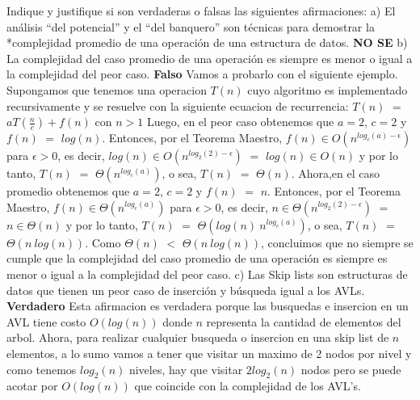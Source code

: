 \documentclass[10pt,a4paper]{article}
\begin{document}
Indique y justifique si son verdaderas o falsas las siguientes afirmaciones:
\newline
\newline
a) El análisis “del potencial” y el “del banquero” son técnicas para demostrar la *complejidad promedio de una operación de una estructura de datos. \textbf{NO SE}
\newline
\newline
b) La complejidad del caso promedio de una operación es siempre es menor o igual a la complejidad del peor caso. \textbf{Falso}
\newline
\newline
Vamos a probarlo con el siguiente ejemplo. Supongamos que tenemos una operacion $T(n)$ cuyo algoritmo es implementado recursivamente y se resuelve con la siguiente ecuacion de recurrencia:
\newline
\newline
$T(n)$ $=$ $aT(\displaystyle \frac{n}{c}) + f(n)$ con $n > 1$
\newline
\newline
Luego, en el peor caso obtenemos que $a = 2$, $c = 2$ y $f(n)$ $=$ $log(n)$. Entonces, por el Teorema Maestro, $f(n) \in O(n^{log_{c}(a) - \epsilon})$ para $\epsilon > 0$, es decir, $log(n) \in O(n^{log_{2}(2) - \epsilon})$ $=$ $log(n) \in O(n)$ y por lo tanto, $T(n)$ $=$ $\Theta(n^{log_{c}(a)})$, o sea, $T(n)$ $=$ $\Theta(n)$.    
\newline
\newline
Ahora,en el caso promedio obtenemos que $a = 2$, $c = 2$ y $f(n)$ $=$ $n$. Entonces, por el Teorema Maestro, $f(n) \in \Theta(n^{log_{c}(a)})$ para $\epsilon > 0$, es decir, $n \in \Theta(n^{log_{2}(2) - \epsilon})$ $=$ $n \in \Theta(n)$ y por lo tanto, $T(n)$ $=$ $\Theta(log(n)~n^{log_{c}(a)})$, o sea, $T(n)$ $=$ $\Theta(n~log(n))$.
\newline
\newline
Como $\Theta(n)$ $<$ $\Theta(n~log(n))$, concluimos que no siempre se cumple que la complejidad del caso promedio de una operación es siempre es menor o igual a la complejidad del peor caso. 
\newline
\newline
c) Las Skip lists son estructuras de datos que tienen un peor caso de inserción y búsqueda igual a los AVLs. \textbf{Verdadero}
\newline
\newline
Esta afirmacion es verdadera porque las busquedas e insercion en un AVL tiene costo $O(log(n))$ donde $n$ representa la cantidad de elementos del arbol. Ahora, para realizar cualquier busqueda o insercion en una skip list de $n$ elementos, a lo sumo vamos a tener que visitar un maximo de 2 nodos por nivel y como tenemos $log_{2}(n)$ niveles, hay que visitar $2log_{2}(n)$ nodos pero se puede acotar por $O(log(n))$ que coincide con la complejidad de los AVL's. 
\end{document}
